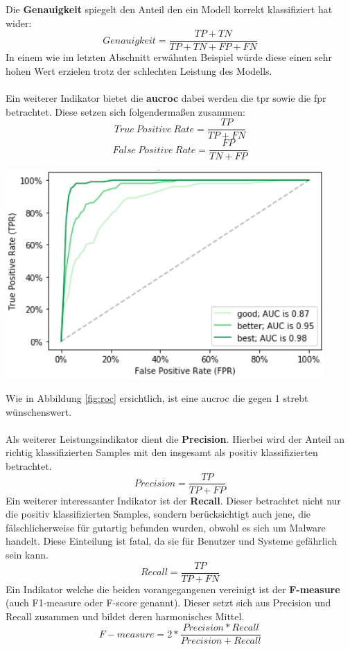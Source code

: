 \documentclass[
    12pt, %
    DIV10,
    ngerman, %
    a4paper, %
    oneside, %
    titlepage, %
    parskip=half, %
    headings=normal, %
    listof=totoc, %
    bibliography=totoc, %
    index=totoc, %
    captions=tableheading, %
    final %
]{scrreprt}
\begin{document}
Die \textbf{Genauigkeit} spiegelt den Anteil den ein Modell korrekt klassifiziert hat wider:
$$Genauigkeit = \frac{TP + TN}{TP + TN + FP + FN}$$ In einem wie im letzten Abschnitt erwähnten Beispiel würde diese einen sehr hohen Wert erzielen trotz der schlechten Leistung des Modells.
\\\\
Ein weiterer Indikator bietet die \textbf{\ac{aucroc}} dabei werden die \ac{tpr} sowie die \ac{fpr} betrachtet. Diese setzen sich folgendermaßen zusammen:
$$True\ Positive\ Rate = \frac{TP}{TP + FN}$$
$$False\ Positive\ Rate = \frac{FP}{TN + FP}$$
\begin{center}
\includegraphics[scale=0.6]{img/roc.png}
\label{fig:roc}
\end{center}
Wie in Abbildung \ref{fig:roc} ersichtlich, ist eine \ac{aucroc} die gegen 1 strebt wünschenswert.
\\\\
Als weiterer Leistungsindikator dient die \textbf{Precision}. Hierbei wird der Anteil an richtig klassifizierten Samples mit den insgesamt als positiv klassifizierten betrachtet.
$$Precision = \frac{TP}{TP + FP}$$
Ein weiterer interessanter Indikator ist der \textbf{Recall}. Dieser betrachtet nicht nur die positiv klassifizierten Samples, sondern berücksichtigt auch jene, die fälschlicherweise für gutartig befunden wurden, obwohl es sich um Malware handelt. Diese Einteilung ist fatal, da sie für Benutzer und Systeme gefährlich sein kann.
$$Recall = \frac{TP}{TP + FN}$$
Ein Indikator welche die beiden vorangegangenen vereinigt ist der \textbf{F-measure} (auch F1-measure oder F-score genannt).
Dieser setzt sich aus Precision und Recall zusammen und bildet deren harmonisches Mittel.
$$F-measure = 2*\frac{Precision * Recall}{Precision + Recall}$$
\end{document}
